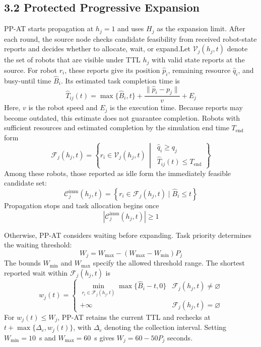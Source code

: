 \documentclass[type=submission,name=IR]{oae}
\begin{document}
\subsection{3.2 Protected Progressive Expansion}
PP-AT starts propagation at $h_j=1$ and uses $H_j$ as the expansion limit. After each round, the source node checks candidate feasibility from received robot-state reports and decides whether to allocate, wait, or expand.Let $\mathcal{V}_j(h_j,t)$ denote the set of robots that are visible under TTL $h_j$ with valid state reports at the source. For robot $r_i$, these reports give its position $\widehat p_i$, remaining resource $\widehat q_i$, and busy-until time $\widehat B_i$. Its estimated task completion time is
\begin{equation}
\widehat T_{ij}(t)=\max\{\widehat B_i,t\}
+\frac{\|\widehat p_i-p_j\|}{v}+E_j
\label{eq:estimated_completion}
\end{equation}
Here, $v$ is the robot speed and $E_j$ is the execution time. Because reports may become outdated, this estimate does not guarantee completion. Robots with sufficient resources and estimated completion by the simulation end time $T_{\mathrm{end}}$ form
\begin{equation}
\mathcal{F}_j(h_j,t)=\left\{r_i\in\mathcal{V}_j(h_j,t)\,\middle|\,
\begin{gathered}
\widehat q_i\geq q_j\\
\widehat T_{ij}(t)\leq T_{\mathrm{end}}
\end{gathered}
\right\}
\label{eq:completable_candidates}
\end{equation}
Among these robots, those reported as idle form the immediately feasible candidate set:
\begin{equation}
\mathcal{C}^{\mathrm{imm}}_j(h_j,t)=
\left\{r_i\in\mathcal{F}_j(h_j,t)\mid\widehat B_i\leq t\right\}
\label{eq:immediate_candidates}
\end{equation}
Propagation stops and task allocation begins once
\begin{equation}
\left|\mathcal{C}^{\mathrm{imm}}_j(h_j,t)\right|\geq1
\label{eq:progressive_ready}
\end{equation}

Otherwise, PP-AT considers waiting before expanding. Task priority determines the waiting threshold:
\begin{equation}
W_j=W_{\max}-(W_{\max}-W_{\min})P_j
\label{eq:waiting_threshold}
\end{equation}
The bounds $W_{\min}$ and $W_{\max}$ specify the allowed threshold range. The shortest reported wait within $\mathcal{F}_j(h_j,t)$ is
\begin{equation}
w_j(t)=\begin{cases}
\displaystyle\min_{r_i\in\mathcal{F}_j(h_j,t)}\max\{\widehat B_i-t,0\}
&\mathcal{F}_j(h_j,t)\neq\varnothing\\
+\infty&\mathcal{F}_j(h_j,t)=\varnothing
\end{cases}
\label{eq:local_wait}
\end{equation}
For $w_j(t)\leq W_j$, PP-AT retains the current TTL and rechecks at $t+\max\{\Delta_c,w_j(t)\}$, with $\Delta_c$ denoting the collection interval. Setting $W_{\min}=10$~s and $W_{\max}=60$~s gives $W_j=60-50P_j$ seconds.
\end{document}
